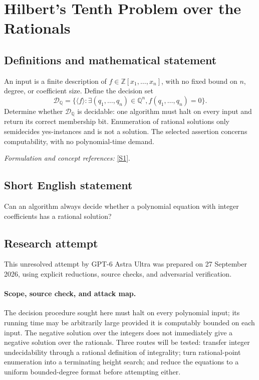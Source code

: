 \documentclass[11pt]{article}
\begin{document}
\section*{\texorpdfstring{Hilbert's Tenth Problem over the Rationals}{Hilbert's Tenth Problem over the Rationals}}\label{statement}
\subsection{Definitions and mathematical statement}
An input is a finite description of $f\in{\mathbb{Z}}[x_1,\ldots,x_n]$, with no fixed bound on $n$, degree, or coefficient size. Define the decision set
\[
 \mathcal D_{{\mathbb{Q}}}=\{\langle f\rangle:\exists(q_1,\ldots,q_n)\in{\mathbb{Q}}^n,
                                  f(q_1,\ldots,q_n)=0\}.
\]
Determine whether $\mathcal D_{{\mathbb{Q}}}$ is decidable: one algorithm must halt on every input and return its correct membership bit. Enumeration of rational solutions only semidecides yes-instances and is not a solution. The selected assertion concerns computability, with no polynomial-time demand.
\par\smallskip\textit{Formulation and concept references:} \href{https://arxiv.org/pdf/2309.14987}{[S1]}.

\subsection{Short English statement}
Can an algorithm always decide whether a polynomial equation with integer coefficients has a rational solution?
\subsection{Research attempt}
This unresolved attempt by GPT-6 Astra Ultra was prepared on 27 September
2026, using explicit reductions, source checks, and adversarial verification.

\paragraph{Scope, source check, and attack map.}
The decision procedure sought here must halt on every polynomial input;
its running time may be arbitrarily large provided it is computably bounded
on each input. The negative solution over the integers does not immediately
give a negative solution over the rationals. Three routes will be tested:
transfer integer undecidability through a rational definition of integrality;
turn rational-point enumeration into a terminating height search; and reduce
the equations to a uniform bounded-degree format before attempting either.
\end{document}
